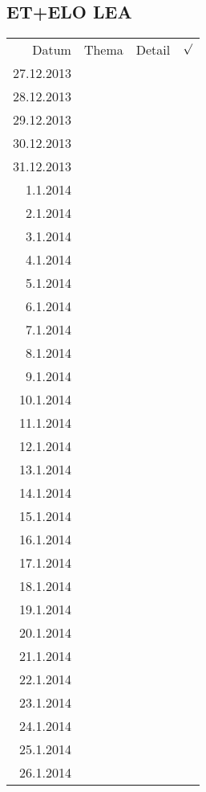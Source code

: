 \subsection{ET+ELO LEA}
\begin{tabular}{r l p{} l}
\rowcolor{lgray} Datum       & Thema         & Detail & $\surd$ \\
\rowcolor{white}  27.12.2013 &               &  &  \\
\rowcolor{lgray}  28.12.2013 &               &  &  \\
\rowcolor{white}  29.12.2013 &               &  &  \\
\rowcolor{lgray}  30.12.2013 &               &  &  \\
\rowcolor{white}  31.12.2013 &               &  &  \\
\rowcolor{lgray}    1.1.2014 &               &  &  \\
\rowcolor{white}    2.1.2014 &               &  &  \\
\rowcolor{lgray}    3.1.2014 &               &  &  \\
\rowcolor{white}    4.1.2014 &               &  &  \\
\rowcolor{lgray}    5.1.2014 &               &  &  \\
\rowcolor{white}    6.1.2014 &               &  &  \\
\rowcolor{lgray}    7.1.2014 &               &  &  \\
\rowcolor{white}    8.1.2014 &               &  &  \\
\rowcolor{lgray}    9.1.2014 &               &  &  \\
\rowcolor{white}   10.1.2014 &               &  &  \\
\rowcolor{lgray}   11.1.2014 &               &  &  \\
\rowcolor{white}   12.1.2014 &               &  &  \\
\rowcolor{lgray}   13.1.2014 &               &  &  \\
\rowcolor{white}   14.1.2014 &               &  &  \\
\rowcolor{lgray}   15.1.2014 &               &  &  \\
\rowcolor{white}   16.1.2014 &               &  &  \\
\rowcolor{lgray}   17.1.2014 &               &  &  \\
\rowcolor{white}   18.1.2014 &               &  &  \\
\rowcolor{lgray}   19.1.2014 &               &  &  \\
\rowcolor{white}   20.1.2014 &               &  &  \\
\rowcolor{lgray}   21.1.2014 &               &  &  \\
\rowcolor{white}   22.1.2014 &               &  &  \\
\rowcolor{lgray}   23.1.2014 &               &  &  \\
\rowcolor{white}   24.1.2014 &               &  &  \\
\rowcolor{lgray}   25.1.2014 &               &  &  \\
\rowcolor{white}   26.1.2014 &               &  &  \\
\end{tabular}

